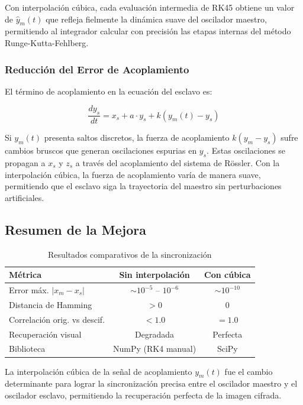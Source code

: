 \documentclass[12pt,a4paper]{article}
\begin{document}
	Con interpolación cúbica, cada evaluación intermedia de RK45 obtiene un valor de $\hat{y}_m(t)$ que refleja fielmente la dinámica suave del oscilador maestro, permitiendo al integrador calcular con precisión las etapas internas del método Runge-Kutta-Fehlberg.
	
	\subsubsection{Reducción del Error de Acoplamiento}
	
	El término de acoplamiento en la ecuación del esclavo es:
	
	$$\frac{dy_s}{dt} = x_s + a \cdot y_s + k(y_m(t) - y_s)$$
	
	Si $y_m(t)$ presenta saltos discretos, la fuerza de acoplamiento $k(y_m - y_s)$ sufre cambios bruscos que generan oscilaciones espurias en $y_s$. Estas oscilaciones se propagan a $x_s$ y $z_s$ a través del acoplamiento del sistema de Rössler. Con la interpolación cúbica, la fuerza de acoplamiento varía de manera suave, permitiendo que el esclavo siga la trayectoria del maestro sin perturbaciones artificiales.
	
	\subsection{Resumen de la Mejora}
	
	\begin{table}[H]
		\centering
		\caption{Resultados comparativos de la sincronización}
		\label{tab:resumen_mejora}
		\begin{tabular}{@{}lcc@{}}
			\toprule
			\textbf{Métrica} & \textbf{Sin interpolación} & \textbf{Con cúbica} \\ \midrule
			Error máx. $|x_m - x_s|$ & $\sim 10^{-5}$ -- $10^{-6}$ & $\sim 10^{-10}$ \\
			Distancia de Hamming & $> 0$ & 0 \\
			Correlación orig. vs descif. & $< 1.0$ & $= 1.0$ \\
			Recuperación visual & Degradada & Perfecta \\
			Biblioteca & NumPy (RK4 manual) & SciPy \\ \bottomrule
		\end{tabular}
	\end{table}
	
	La interpolación cúbica de la señal de acoplamiento $y_m(t)$ fue el cambio determinante para lograr la sincronización precisa entre el oscilador maestro y el oscilador esclavo, permitiendo la recuperación perfecta de la imagen cifrada.
	
\end{document}
